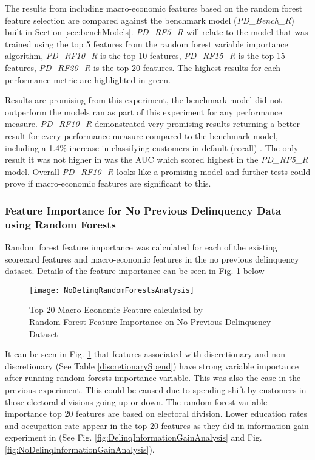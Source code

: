 The results from including macro-economic features based on the random forest feature selection are compared against the benchmark model (\textit{PD\_Bench\_R}) built in Section \ref{sec:benchModels}. \textit{PD\_RF5\_R} will relate to the model that was trained using the top 5 features from the random forest variable importance algorithm, \textit{PD\_RF10\_R} is the top 10 features, \textit{PD\_RF15\_R} is the top 15 features, \textit{PD\_RF20\_R} is the top 20 features. The highest results for each performance metric are highlighted in green.

Results are promising from this experiment, the benchmark model did not outperform the models ran as part of this experiment for any performance measure. \textit{PD\_RF10\_R} demonstrated  very promising results returning a better result for every performance measure compared to the benchmark model, including a 1.4\% increase in classifying customers in default (recall) . The only result it was not higher in was the AUC which scored highest in the \textit{PD\_RF5\_R} model. Overall \textit{PD\_RF10\_R} looks like a promising model and further tests could prove if macro-economic features are significant to this.

\subsubsection{Feature Importance for No Previous Delinquency Data using Random Forests}\label{RFNPDExper}

Random forest feature importance was calculated for
each of the existing scorecard features and macro-economic features in the no previous delinquency dataset. Details of the feature importance can be seen in Fig. \ref{fig:NoDelinqRandomForestsAnalysis} below

\begin{figure}[H]
	\texttt{[image: NoDelinqRandomForestsAnalysis]}
	\caption{Top 20 Macro-Economic Feature calculated by \\
		Random Forest Feature Importance on No Previous Delinquency Dataset}
	\label{fig:NoDelinqRandomForestsAnalysis}
\end{figure}


It can be seen in Fig. \ref{fig:NoDelinqRandomForestsAnalysis} that features associated with discretionary and non discretionary (See Table \ref{discretionarySpend}) have strong variable importance after running random forests importance variable. This was also the case in the previous experiment. This could be caused due to spending shift by customers in those electoral divisions going up or down. The random forest variable importance top 20 features are based on electoral division. Lower education rates and occupation rate appear in the top 20 features as they did in information gain experiment in (See Fig. \ref{fig:DelinqInformationGainAnalysis} and Fig. \ref{fig:NoDelinqInformationGainAnalysis}).


